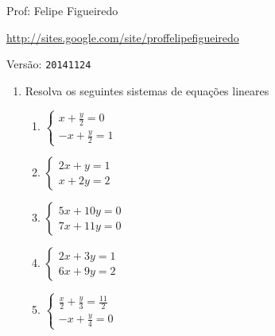 \documentclass[a4paper]{article}
\begin{document}
\parbox[c]{.825\textwidth}{\raggedright%
{Prof: Felipe Figueiredo\par}
{\url{http://sites.google.com/site/proffelipefigueiredo}\par}
}

Versão: \verb|20141124|




\begin{enumerate}
\item Resolva os seguintes sistemas de equações lineares

  \begin{enumerate}
  \item $\left\{
      \begin{array}{ll}  
        x + \frac{y}{2} = 0\\
        -x + \frac{y}{2} =1 
      \end{array}
    \right.$
    
  \item $\left\{
      \begin{array}{ll}  
        2x +y =1\\
        x + 2y = 2
      \end{array}
    \right.$

  \item $\left\{
      \begin{array}{ll}  
        5x  + 10y = 0\\
        7x + 11y = 0
      \end{array}
    \right.$

  \item $\left\{
      \begin{array}{ll}  
        2x + 3y = 1\\
        6x +9y = 2
      \end{array}
    \right.$

  \item $\left\{
      \begin{array}{ll}  
        \frac{x}{2} + \frac{y}{3} = \frac{11}{2}\\
        -x + \frac{y}{4} = 0
      \end{array}
    \right.$


\end{enumerate}
\end{enumerate}
\end{document}
